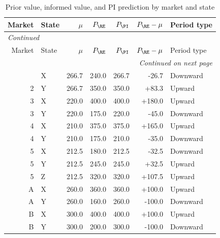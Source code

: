 \scriptsize
\begin{longtable}{rlrrrrl}
\caption{Prior value, informed value, and PI prediction by market and state}\label{tab:app-benchmarks}\\
\toprule
Market & State & $\mu$ & $P_{\RE}$ & $P_{\PI}$ & $P_{\RE}-\mu$ & Period type \\
\midrule
\endfirsthead
\multicolumn{7}{l}{\textit{Continued}}\\
\toprule
Market & State & $\mu$ & $P_{\RE}$ & $P_{\PI}$ & $P_{\RE}-\mu$ & Period type \\
\midrule
\endhead
\midrule
\multicolumn{7}{r}{\textit{Continued on next page}}\\
\endfoot
\bottomrule
\endlastfoot
2 & X & 266.7 & 240.0 & 266.7 & -26.7 & Downward \\
2 & Y & 266.7 & 350.0 & 350.0 & +83.3 & Upward \\
3 & X & 220.0 & 400.0 & 400.0 & +180.0 & Upward \\
3 & Y & 220.0 & 175.0 & 220.0 & -45.0 & Downward \\
4 & X & 210.0 & 375.0 & 375.0 & +165.0 & Upward \\
4 & Y & 210.0 & 175.0 & 210.0 & -35.0 & Downward \\
5 & X & 212.5 & 180.0 & 212.5 & -32.5 & Downward \\
5 & Y & 212.5 & 245.0 & 245.0 & +32.5 & Upward \\
5 & Z & 212.5 & 320.0 & 320.0 & +107.5 & Upward \\
A & X & 260.0 & 360.0 & 360.0 & +100.0 & Upward \\
A & Y & 260.0 & 160.0 & 260.0 & -100.0 & Downward \\
B & X & 300.0 & 400.0 & 400.0 & +100.0 & Upward \\
B & Y & 300.0 & 200.0 & 300.0 & -100.0 & Downward \\
\end{longtable}
